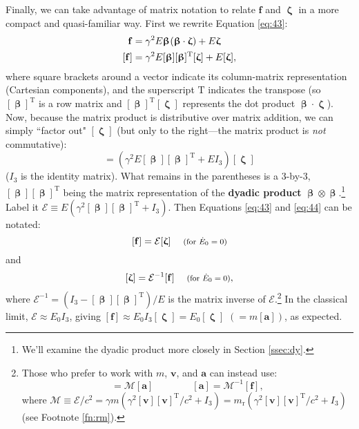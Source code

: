 \documentclass[12pt]{article}
\renewcommand{\vv}[1]{\mathbf{#1}}
\newcommand{\vvbeta}{\bm{\upbeta}}
\newcommand{\vvzeta}{\bm{\upzeta}}
\begin{document}
Finally, we can take advantage of matrix notation to relate $\vv f$ and $\vvzeta$ in a more compact and quasi-familiar way. First we rewrite Equation \ref{eq:43}:
\begin{equation*}
\begin{split}
\vv f &= \gamma^2 E \vvbeta \mkern1mu (\vvbeta \cdot \vvzeta) + E \vvzeta \\
[\vv f] &= \gamma^2 E [\vvbeta] [\vvbeta]^{\mathrm{T}} [\vvzeta] + E [\vvzeta] ,
\end{split}
\end{equation*}
where square brackets around a vector indicate its column-matrix representation (Cartesian components), and the superscript $\mathrm{T}$ indicates the transpose (so $[\vvbeta]^{\mathrm{T}}$ is a row matrix and $[\vvbeta]^{\mathrm{T}} [\vvzeta]$ represents the dot product $\vvbeta \cdot \vvzeta$). Now, because the matrix product is distributive over matrix addition, we can simply ``factor out" $[\vvzeta]$ (but only to the right---the matrix product is \emph{not} commutative):
\begin{equation*}
[\vv f] = (\gamma^2 E [\vvbeta] [\vvbeta]^{\mathrm{T}} + E I_3) [\vvzeta]
\end{equation*}
($I_3$ is the identity matrix). What remains in the parentheses is a 3-by-3, $[\vvbeta] [\vvbeta]^{\mathrm{T}}$ being the matrix representation of the \textbf{dyadic product} $\vvbeta \otimes \vvbeta$.\footnote{We'll examine the dyadic product more closely in Section \ref{ssec:dy}.} Label it $\mathcal{E} \equiv E(\gamma^2 [\vvbeta] [\vvbeta]^{\mathrm{T}} + I_3)$. Then Equations \ref{eq:43} and \ref{eq:44} can be notated:
\begin{equation}\label{eq:48}
[\vv f] = \mathcal{E} [\vvzeta] \quad \textrm{\footnotesize{ (for $\dot{E}_0 = 0$)}}
\end{equation}
and
\begin{equation}\label{eq:49}
[\vvzeta] = \mathcal{E}^{-1} [\vv f] \quad \textrm{\footnotesize{ (for $\dot{E}_0 = 0$)}},
\end{equation}
where $\mathcal{E}^{-1} = (I_3 - [\vvbeta] [\vvbeta]^{\mathrm{T}})/E$ is the matrix inverse of $\mathcal{E}$.\footnote{Those who prefer to work with $m$, $\vv v$, and $\vv a$ can instead use:
\begin{equation*}
[\vv f] = \mathcal{M} [\vv a] \qquad \qquad [\vv a] = \mathcal{M}^{-1} [\vv f],
\end{equation*}
where $\mathcal{M} \equiv \mathcal{E} / c^2 = \gamma m (\gamma^2 [\vv v] [\vv v]^{\mathrm{T}}/c^2 + I_3) =  m_{\textrm{r}}(\gamma^2 [\vv v] [\vv v]^{\mathrm{T}}/c^2 + I_3)$ (see Footnote \ref{fn:rm}).} In the classical limit, $\mathcal{E} \approx E_0 I_3$, giving $[\vv f] \approx E_0 I_3 [\vvzeta] = E_0 [\vvzeta]$ $(= m [\vv a])$, as expected.
\end{document}
